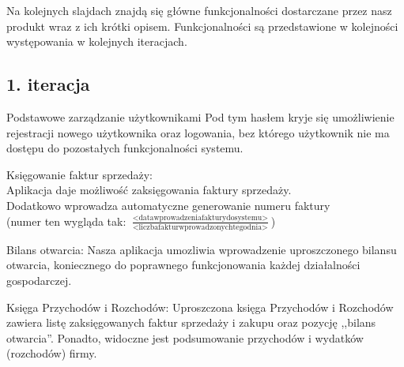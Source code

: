 \documentclass{beamer}
\begin{document}
  \begin{frame}
    \begin{block}{}
      Na kolejnych slajdach znajdą się główne funkcjonalności dostarczane przez nasz produkt wraz z ich krótki opisem. Funkcjonalności są przedstawione w kolejności występowania w kolejnych iteracjach.
    \end{block}
  \end{frame}
\subsection{1. iteracja}
  \begin{frame}
    \begin{block}{Podstawowe zarządzanie użytkownikami}
      Pod tym hasłem kryje się umożliwienie rejestracji nowego użytkownika oraz logowania, bez którego użytkownik nie ma dostępu do pozostałych funkcjonalności systemu.
    \end{block}
  \end{frame}
  \begin{frame}
    \begin{block}{}
      Księgowanie faktur sprzedaży:\\
      Aplikacja daje możliwość zaksięgowania faktury sprzedaży.\\
      Dodatkowo wprowadza automatyczne generowanie numeru faktury\\
      (numer ten wygląda tak: $\frac{\operatorname{<data wprowadzenia faktury do systemu>}}{\operatorname{<liczba faktur wprowadzonych tego dnia>}}$)
    \end{block}
  \end{frame}
  \begin{frame}
    \begin{block}{}
      Bilans otwarcia: Nasza aplikacja umozliwia wprowadzenie uproszczonego bilansu otwarcia, koniecznego do poprawnego funkcjonowania każdej działalności gospodarczej.
    \end{block}
  \end{frame}
  \begin{frame}
    \begin{block}{}
      Księga Przychodów i Rozchodów: Uproszczona księga Przychodów i Rozchodów zawiera listę zaksięgowanych faktur sprzedaży i zakupu oraz pozycję ,,bilans otwarcia''. Ponadto, widoczne jest podsumowanie przychodów i wydatków (rozchodów) firmy.
    \end{block}
  \end{frame}
\end{document}
